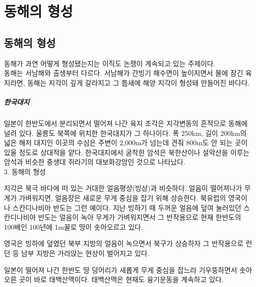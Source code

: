 \documentclass[12pt,a4paper]{book}
\newcommand{\SectionMargin}			{\newpage  \null \vskip 0cm}
\begin{document}
\newpage
\chapter{동해의 형성}


	\SectionMargin
	\section{동해의 형성}
	\null
	
			동해가 과연 어떻게 형성됐는지는 이직도 논쟁이 계속되고 있는 주제이다.
			\\[-1.0em]

			동해는 서남해와 출생부터 다르다. 
			서남해가 간빙기 해수면이 높이지면서 물에 잠긴 육지라면, 동해는 지각이 깊게 갈라지고 그 틈새에 해양 지각이 형성돼 만들어진 바다다.
			\\[-1.0em]

			\paragraph{한국대지}
			일본이 한반도에서 분리되면서 떨어져 나간 육지 조각은 지각변동의 흔적으로 동해에 널려 있다. 
			울릉도 북쪽에 위치한 한국대지가 그 하나이다. 
			폭 250km, 길이 200km의 넓은 해저 대지인 이곳의 수심은 주변이 2,000m가 넘는데 견줘 800m도 안 되는 곳이 있울 정도로 상대적을 얕다. 
			한국대지에서 굴착한 암석은 북한산이나 설악산을 이루는 암석과 비슷한 중생대 쥐라기의 대보화강암인 것으로 나타났다.
			\\[-1.0em]



3. 		동해의 형성

지각은 북극 바다에 떠 있는 거대한 얼음평상(빙상)과 비슷하다. 
얼음이 떨어져나가 무게가 가벼워지면, 얼음장은 새로운 무게 중심을 잡기 위해 상승한다. 북유럽의 영국이나 스칸디나비아 반도는 그런 예이다. 지난 빙하기 때 두꺼운 얼음에 덮여 눌러있던 스칸디나비아 반도는 얼음이 녹아 무게가 가벼워지면서 그 반작용으로 현재 한반도의 100배인 100년에 1m꼴로 땅이 솟아오르고 있다. 

영국은 빙하에 덮였던 북부 지방의 얼음이 녹으면서 북구가 상승하자 그 반작용으로 런던 등 남부 지방은 가라앉는 현상이 벌어지고 있다. 

일본이 떨어져 나간 한반도 땅 덩어리가 새롭게 무게 중심을 잡느라 기우뚱하면서 솟아오른 곳이 바로 태백산맥이다. 태백산맥은 현재도 융기운동을 계속하고 있다. \\
\end{document}
